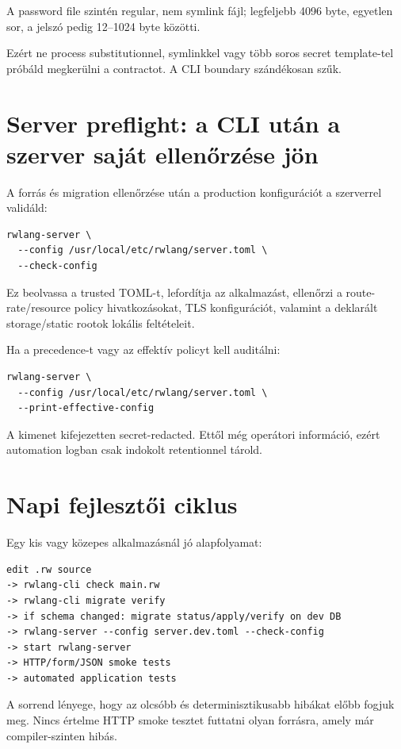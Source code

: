 A password file szintén regular, nem symlink fájl; legfeljebb 4096 byte, egyetlen sor, a jelszó pedig 12--1024 byte közötti.

Ezért ne process substitutionnel, symlinkkel vagy több soros secret template-tel próbáld megkerülni a contractot. A CLI boundary szándékosan szűk.

\section{Server preflight: a CLI után a szerver saját ellenőrzése jön}

A forrás és migration ellenőrzése után a production konfigurációt a szerverrel validáld:

\begin{lstlisting}
rwlang-server \
  --config /usr/local/etc/rwlang/server.toml \
  --check-config
\end{lstlisting}

Ez beolvassa a trusted TOML-t, lefordítja az alkalmazást, ellenőrzi a route-rate/resource policy hivatkozásokat, TLS konfigurációt, valamint a deklarált storage/static rootok lokális feltételeit.

Ha a precedence-t vagy az effektív policyt kell auditálni:

\begin{lstlisting}
rwlang-server \
  --config /usr/local/etc/rwlang/server.toml \
  --print-effective-config
\end{lstlisting}

A kimenet kifejezetten secret-redacted. Ettől még operátori információ, ezért automation logban csak indokolt retentionnel tárold.

\section{Napi fejlesztői ciklus}

Egy kis vagy közepes alkalmazásnál jó alapfolyamat:

\begin{lstlisting}
edit .rw source
-> rwlang-cli check main.rw
-> rwlang-cli migrate verify
-> if schema changed: migrate status/apply/verify on dev DB
-> rwlang-server --config server.dev.toml --check-config
-> start rwlang-server
-> HTTP/form/JSON smoke tests
-> automated application tests
\end{lstlisting}

A sorrend lényege, hogy az olcsóbb és determinisztikusabb hibákat előbb fogjuk meg. Nincs értelme HTTP smoke tesztet futtatni olyan forrásra, amely már compiler-szinten hibás.

